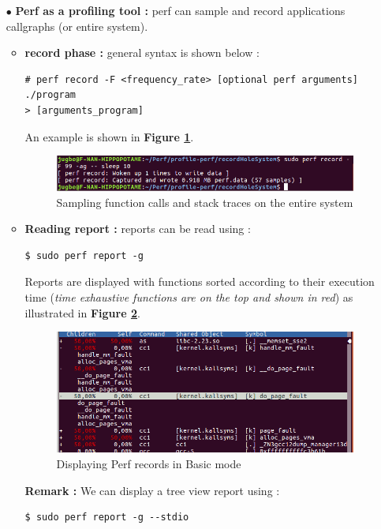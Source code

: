 \begin{itemize}
\begin{enumerate}
		\end{enumerate}

	\item[$\bullet$] \textbf{Perf as a profiling tool : } perf can sample and record  applications callgraphs (or entire system).
	
	\begin{itemize}
		\item \textbf{record phase : } general syntax is shown below :
	\begin{lstlisting}[style=BashInputStyle]
# perf record -F <frequency_rate> [optional perf arguments] ./program 
> [arguments_program]
	\end{lstlisting}	
	
	
An example is shown in \textbf{Figure \ref{Sampling function calls and stack traces on  the entire system}}.	
					\begin{figure}[H]
						\centering
        				\includegraphics[scale=0.5]{img/solution/record-hole-system-perf.png}
        				\caption{Sampling function calls and stack traces on  the entire system}
        				\label{Sampling function calls and stack traces on  the entire system}
    				\end{figure}
    				
    				
    	\item \textbf{Reading report : } reports can be read using :
 	\begin{lstlisting}[style=BashInputStyle]   	
    	$ sudo perf report -g	
    \end{lstlisting}	
Reports are displayed with functions sorted according to their execution time
(\textit{time exhaustive functions are on the top and shown in red})  as illustrated in \textbf{Figure \ref{Displaying Perf records in Basic mode}}.			
					\begin{figure}[H]
						\centering
        				\includegraphics[scale=0.55]{img/solution/basic-display-record-mode-perf.png}
        				\caption{Displaying Perf records in Basic mode}
        				\label{Displaying Perf records in Basic mode}
    				\end{figure}
 \textbf{\color{orange}Remark : } We can display a tree view report using : 
 	\begin{lstlisting}[style=BashInputStyle]   	
    	$ sudo perf report -g --stdio 
    \end{lstlisting} 
   				

\end{itemize}
\end{itemize}
